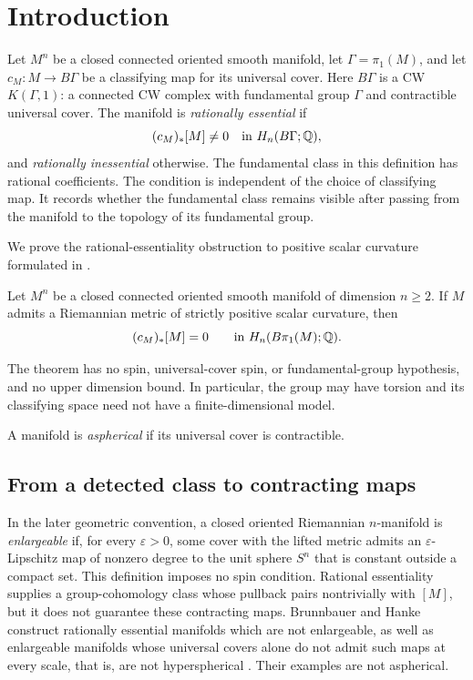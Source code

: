 \section{Introduction}
\label{sec:introduction}

Let $M^n$ be a closed connected oriented smooth manifold, let
$\Gamma=\pi_1(M)$, and let $c_M:M\to B\Gamma$ be a classifying map
for its universal cover. Here $B\Gamma$ is a CW $K(\Gamma,1)$: a connected
CW complex with fundamental group $\Gamma$ and contractible universal cover.
The manifold is
\emph{rationally essential} if
\[
 (c_M)_*[M]\ne0\quad\text{in }H_n(B\Gamma;\mathbb Q),
\]
and \emph{rationally inessential} otherwise. The fundamental class in this
definition has rational coefficients. The condition is independent of the
choice of classifying map. It records whether the fundamental class remains
visible after passing from the manifold to the topology of its fundamental
group.

We prove the rational-essentiality obstruction to positive scalar curvature
formulated in \cite[Conjecture~2.9]{Hanke2011}.

\begin{theorem}
\label{thm:main}
Let $M^n$ be a closed connected oriented smooth manifold of dimension
$n\ge2$. If $M$ admits a Riemannian metric of strictly positive scalar
curvature, then
\[
 (c_M)_*[M]=0\qquad\text{in }H_n(B\pi_1(M);\mathbb Q).
\]
\end{theorem}

The theorem has no spin, universal-cover spin, or fundamental-group
hypothesis, and no upper dimension bound. In particular, the group may
have torsion and its classifying space need not have a finite-dimensional
model.

A manifold is \emph{aspherical} if its universal cover is contractible.

\subsection{From a detected class to contracting maps}

In the later geometric convention, a closed oriented Riemannian
$n$-manifold is \emph{enlargeable} if, for every $\varepsilon>0$, some cover
with the lifted metric admits an $\varepsilon$-Lipschitz map of nonzero degree
to the unit sphere $S^n$ that is constant outside a compact set. This
definition imposes no spin condition. Rational essentiality supplies a
group-cohomology class whose pullback pairs nontrivially with $[M]$, but it
does not guarantee these contracting maps. Brunnbauer and Hanke construct
rationally essential manifolds which are not enlargeable, as well as
enlargeable manifolds whose universal covers alone do not admit such maps
at every scale, that is, are not hyperspherical
\cite[Theorems~1.4--1.5]{BrunnbauerHanke2010}. Their examples are not aspherical.

